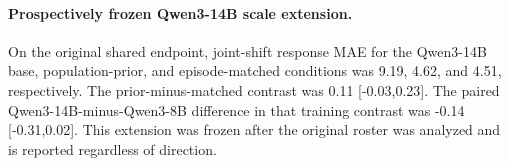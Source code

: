 \paragraph{Prospectively frozen Qwen3-14B scale extension.} On the original shared endpoint, joint-shift response MAE for the Qwen3-14B base, population-prior, and episode-matched conditions was 9.19, 4.62, and 4.51, respectively. The prior-minus-matched contrast was 0.11 [-0.03,0.23]. The paired Qwen3-14B-minus-Qwen3-8B difference in that training contrast was -0.14 [-0.31,0.02]. This extension was frozen after the original roster was analyzed and is reported regardless of direction.
